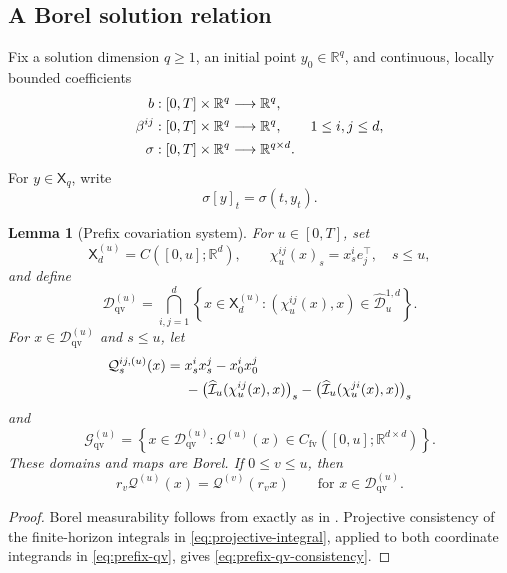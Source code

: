 \documentclass[11pt,reqno]{amsart}
\theoremstyle{plain}
\newtheorem{lemma}[lemma]{Lemma}
\theoremstyle{definition}
\newcommand{\R}{\mathbb R}
\newcommand{\cD}{\mathcal D}
\newcommand{\cG}{\mathcal G}
\newcommand{\cI}{\mathcal I}
\newcommand{\qv}{\mathcal Q}
\begin{document}
\subsection{A Borel solution relation}

Fix a solution dimension \(q\ge1\), an initial point \(y_0\in\R^q\), and
continuous, locally bounded coefficients
\begin{align}
  b&:[0,T]\times\R^q\longrightarrow\R^q, \notag\\
  \beta^{ij}&:[0,T]\times\R^q\longrightarrow\R^q,
       \qquad 1\le i,j\le d, \notag\\
  \sigma&:[0,T]\times\R^q\longrightarrow\R^{q\times d}.
  \label{eq:coefficients}
\end{align}
For \(y\in\mathsf X_q\), write
\[
  \sigma[y]_t=\sigma(t,y_t).
\]

\begin{lemma}[Prefix covariation system]\label{lem:prefix-qv}
For \(u\in[0,T]\), set
\[
  \mathsf X_d^{(u)}=C([0,u];\R^d),
  \qquad
  \chi_u^{ij}(x)_s=x_s^ie_j^\top,\quad s\le u,
\]
and define
\[
  \cD_{\mathrm{qv}}^{(u)}
  =
  \bigcap_{i,j=1}^d
  \left\{
    x\in\mathsf X_d^{(u)}:
    (\chi_u^{ij}(x),x)\in\widehat{\cD}_u^{1,d}
  \right\}.
\]
For \(x\in\cD_{\mathrm{qv}}^{(u)}\) and \(s\le u\), let
\begin{align}
  \qv_s^{ij,(u)}(x)
  ={}&
  x_s^ix_s^j-x_0^ix_0^j \notag\\
  &-
  \bigl(\widehat{\cI}_u(\chi_u^{ij}(x),x)\bigr)_s
  -
  \bigl(\widehat{\cI}_u(\chi_u^{ji}(x),x)\bigr)_s
  \label{eq:prefix-qv}
\end{align}
and
\[
  \cG_{\mathrm{qv}}^{(u)}
  =
  \left\{
    x\in\cD_{\mathrm{qv}}^{(u)}:
    \qv^{(u)}(x)\in
    C_{\mathrm{fv}}([0,u];\R^{d\times d})
  \right\}.
\]
These domains and maps are Borel.  If \(0\le v\le u\), then
\begin{equation}\label{eq:prefix-qv-consistency}
  r_v\qv^{(u)}(x)=\qv^{(v)}(r_vx)
  \qquad
  \text{for }x\in\cD_{\mathrm{qv}}^{(u)}.
\end{equation}
\end{lemma}

\begin{proof}
Borel measurability follows from
 exactly as in
.  Projective consistency of the finite-horizon
integrals in \eqref{eq:projective-integral}, applied to both coordinate
integrands in \eqref{eq:prefix-qv}, gives
\eqref{eq:prefix-qv-consistency}.
\end{proof}
\end{document}
